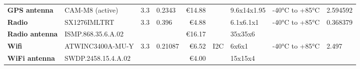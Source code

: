 \begin{table}[H]
\begin{scriptsize}
\begin{tabular}{l|lllrllll}
\textbf{GPS antenna}                                                      & CAM-M8 (active)     & 3.3                                                                           & 0.2343                                                                         & €14.88                                                                                   &                                                                            & 9.6x14x1.95                                                                 & -40°C to +85°C                                                        & 2.594592                \\
\textbf{Radio}                                                            & SX1276IMLTRT        & 3.3                                                                           & 0.396                                                                          & €4.88                                                                                    &                                                                            & 6.1x6.1x1                                                                   & -40°C to +85°C                                                        & 0.368379                \\
\textbf{Radio antenna}                                                    & ISMP.868.35.6.A.02  &                                                                               &                                                                                & €16.17                                                                                   &                                                                            & 35x35x6                                                                     &                                                                       &                         \\
\textbf{Wifi}                                                             & ATWINC3400A-MU-Y    & 3.3                                                                           & 0.21087                                                                        & €6.52                                                                                    & I2C                                                                        & 6x6x1                                                                       & -40°C to +85°C                                                        & 2.497                   \\
\textbf{WiFi antenna}                                                     & SWDP.2458.15.4.A.02 &                                                                               &                                                                                & €4.00                                                                                    &                                                                            & 15x15x4                                                                     &                                                                       &                         \\

\end{tabular}
\end{scriptsize}
\end{table}
